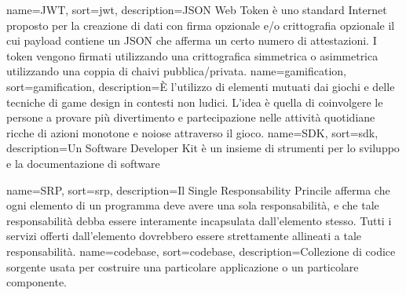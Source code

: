 {
    name=JWT,
    sort=jwt,
    description={JSON Web Token è uno standard Internet proposto per la creazione di dati con firma opzionale e/o crittografia opzionale il cui payload contiene un JSON che afferma un certo numero di attestazioni. I token vengono firmati utilizzando una crittografica simmetrica o asimmetrica utilizzando una coppia di chaivi pubblica/privata.}
}
{
    name=gamification,
    sort=gamification,
    description={È l'utilizzo di elementi mutuati dai giochi e delle tecniche di game design in contesti non ludici. L'idea è quella di coinvolgere le persone a provare più divertimento e partecipazione nelle attività quotidiane ricche di azioni monotone e noiose attraverso il gioco.}
}
{
    name=SDK,
    sort=sdk,
    description={Un Software Developer Kit è un insieme di strumenti per lo sviluppo e la documentazione di software}
}

{
    name=SRP,
    sort=srp,
    description={Il Single Responsability Princile afferma che ogni elemento di un programma deve avere una sola responsabilità, e che tale responsabilità debba essere interamente incapsulata dall'elemento stesso. Tutti i servizi offerti dall'elemento dovrebbero essere strettamente allineati a tale responsabilità. }
}
{
    name=codebase,
    sort=codebase,
    description={Collezione di codice sorgente usata per costruire una particolare applicazione o un particolare componente.}
}
